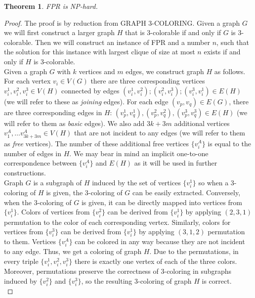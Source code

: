\documentclass{pracamgren}
\newcounter{collective_ctr} \numberwithin{collective_ctr}{section}
\newtheorem{theorem}{Theorem}[collective_ctr]
\begin{document}
\begin{theorem}
FPR is NP-hard.
\end{theorem}
\begin{proof}

The proof is by reduction from GRAPH 3-COLORING. Given a graph $G$ we will first construct a larger graph $H$ that is 3-colorable if and only if $G$ is 3-colorable. Then we will construct an instance of FPR and a number $n$, such that the solution for this instance with largest clique of size at most $n$ exists if and only if $H$ is 3-colorable.\\

Given a graph $G$ with $k$ vertices and $m$ edges, we construct graph $H$ as follows. For each vertex $v_i\in V(G)$ there are three corresponding vertices $v^1_i, v^2_i, v^3_i \in V(H)$ connected by edges $(v^1_i, v^2_i); (v^2_i, v^3_i); (v^3_i, v^1_i) \in E(H)$ (we will refer to these as {\it joining} edges). For each edge $(v_p, v_q) \in E(G)$, there are three corresponding edges in $H$: $(v^1_p, v^1_q), (v^2_p, v^2_q), (v^3_p, v^3_q) \in E(H)$ (we will refer to them as {\it basic} edges). We also add $3k + 3m$ additional vertices $v^A_1,\ldots v^A_{3k+3m}\in V(H)$ that are not incident to any edges (we will refer to them as {\it free} vertices). The number of these additional free vertices $\{v^A_i\}$ is equal to the number of edges in $H$. We may bear in mind an implicit one-to-one correspondence between $\{v^A_i\}$ and $E(H)$ as it will be used in further constructions.\\

Graph $G$ is a subgraph of $H$ induced by the set of vertices $\{v^1_i\}$ so when a 3-coloring of $H$ is given, the 3-coloring of $G$ can be easily extracted. Conversely, when the 3-coloring of $G$ is given, it can be directly mapped into vertices from $\{v^1_i\}$. Colors of vertices from $\{v^2_i\}$ can be derived from $\{v^1_i\}$ by applying $(2,3,1)$ permutation to the color of each corresponding vertex. Similarly, colors for vertices from $\{v^3_i\}$ can be derived from $\{v^1_i\}$ by applying $(3,1,2)$ permutation to them. Vertices $\{v^A_i\}$ can be colored in any way because they are not incident to any edge. Thus, we get a coloring of graph $H$. Due to the permutations, in every triple $\{v^1_i, v^2_i, v^3_i\}$ there is exactly one vertex of each of the three colors. Moreover, permutations preserve the correctness of 3-coloring in subgraphs induced by $\{v^2_i\}$ and $\{v^3_i\}$, so the resulting 3-coloring of graph $H$ is correct.\\


\end{proof}
\end{document}
